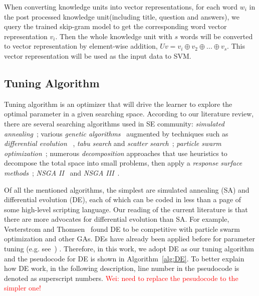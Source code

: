 \documentclass[sigconf,review, anonymous]{acmart}
\theoremstyle{break}
\newcommand{\wei}[1]{\textcolor{red}{Wei: #1}}
\begin{document}
When converting knowledge units into vector representations, 
for each word $w_i$ in the post processed knowledge unit(including title, question and answers),
we query the trained skip-gram model to get the corresponding word vector representation $v_i$.
Then the whole knowledge unit with $s$ words
will be converted to vector representation by element-wise addition, $Uv = v_i \oplus v_2 \oplus...\oplus v_s $. 
This vector representation will be used
as the input data to SVM.




\subsection{Tuning Algorithm}

Tuning algorithm is an optimizer that will drive the learner to explore
the optimal parameter in a given searching space. According to our
literature review, there are several searching algorithms used in 
SE community:{\em 
simulated annealing}~\cite{feather2002converging,menzies2007data};
 various {\em genetic algorithms}~\cite{jones1996automatic,harman2007current, arcuri2011parameter} augmented by
techniques such as {\em differential evolution}
~\cite{storn1997differential, fu2016tuning, fu2016differential,chaves2015differential,agrawal2016wrong}, 
{\em tabu search} and {\em scatter search}~\cite{beausoleil2006moss,molina2007sspmo,corazza2013using};
{\em particle swarm optimization}~\cite{windisch2007applying}; 
numerous {\em decomposition} approaches that use
    heuristics to decompose the total space into   small problems,   then apply a
    {\em response surface methods}~\cite{krall2015gale};
     {\em NSGA II} ~\cite{zhang2007multi}and {\em NSGA III}~\cite{mkaouer2014high}.


Of all the mentioned algorithms,  the simplest are simulated annealing (SA)  and 
differential evolution (DE), each of which can be coded in less than a page of some high-level scripting language.
 Our reading of the current literature is that there are more  advocates for
differential evolution than SA. For example,  Vesterstrom and Thomsen~\cite{Vesterstrom04} found DE to be competitive with 
 particle swarm optimization and other GAs.  DEs have already been applied before for 
 parameter tuning (e.g. see~\cite{omran2005differential, chiha2012tuning, fu2016tuning, fu2016differential, agrawal2016wrong}) .
Therefore, in this work, we adopt DE as our tuning algorithm and 
the pseudocode for DE is shown in Algorithm~\ref{alg:DE}.
To better explain how DE work, in the following description, 
line number in the pseudocode is denoted as superscript numbers.
\wei{need to replace the pesudocode to the simpler one!}
\end{document}
